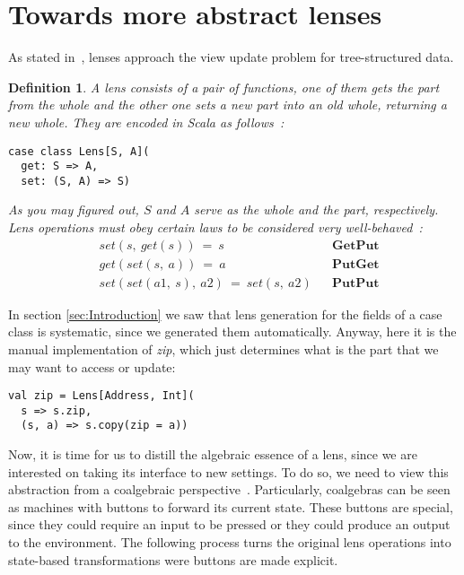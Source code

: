 \documentclass[preview, 3p]{elsarticle}
\newtheorem{definition}{Definition}[section]
\begin{document}
\section{Towards more abstract lenses}
\label{sec:Towards}

As stated in~\cite{foster2005combinators}, lenses approach the view update
problem for tree-structured data.

\begin{definition}

A \emph{lens} consists of a pair of functions, one of them \emph{gets} the
part from the whole and the other one \emph{sets} a new part into an old whole,
returning a new whole. They are encoded in Scala as
follows~\cite{morris2012asymmetric}:

\begin{lstlisting}
case class Lens[S, A](
  get: S => A,
  set: (S, A) => S)
\end{lstlisting}
As you may figured out, $S$ and $A$ serve as the whole and the part,
respectively. Lens operations must obey certain laws to be considered very
well-behaved~\cite{fischer2015clear}:
\begin{align*}
  & set(s,\ get(s))\ =\ s &&\textbf{GetPut} \\
  & get(set(s,\ a))\ =\ a &&\textbf{PutGet} \\
  & set(set(a1,\ s),\ a2)\ =\ set(s,\ a2) &&\textbf{PutPut}
\end{align*}

\end{definition}

In section \ref{sec:Introduction} we saw that lens generation for the fields of
a case class is systematic, since we generated them automatically. Anyway, here
it is the manual implementation of \emph{zip}, which just determines what is the
part that we may want to access or update:

\begin{lstlisting}
val zip = Lens[Address, Int](
  s => s.zip,
  (s, a) => s.copy(zip = a))
\end{lstlisting}

Now, it is time for us to distill the algebraic essence of a lens, since we are
interested on taking its interface to new settings. To do so, we need to view
this abstraction from a coalgebraic perspective~\cite{jacobs1995objects,
jacobs1997tutorial}. Particularly, coalgebras can be seen as machines with
buttons to forward its current state. These buttons are special, since they
could require an input to be pressed or they could produce an output to the
environment. The following process turns the original lens operations into
state-based transformations were buttons are made explicit.
\end{document}

